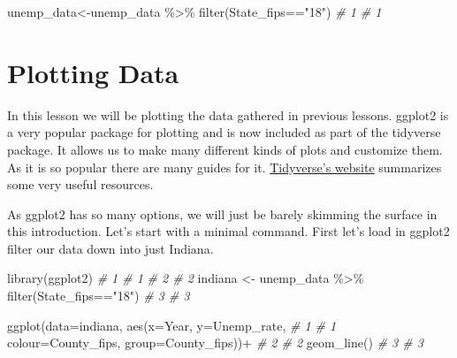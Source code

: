 \documentclass[
]{book}
\newenvironment{Shaded}{\begin{snugshade}}{\end{snugshade}}
\newcommand{\AttributeTok}[1]{\textcolor[rgb]{0.77,0.63,0.00}{#1}}
\newcommand{\CommentTok}[1]{\textcolor[rgb]{0.56,0.35,0.01}{\textit{#1}}}
\newcommand{\FunctionTok}[1]{\textcolor[rgb]{0.00,0.00,0.00}{#1}}
\newcommand{\NormalTok}[1]{#1}
\newcommand{\OtherTok}[1]{\textcolor[rgb]{0.56,0.35,0.01}{#1}}
\newcommand{\SpecialCharTok}[1]{\textcolor[rgb]{0.00,0.00,0.00}{#1}}
\newcommand{\StringTok}[1]{\textcolor[rgb]{0.31,0.60,0.02}{#1}}
\begin{document}
\begin{Shaded}
\begin{Highlighting}[]
\NormalTok{unemp\_data}\OtherTok{\textless{}{-}}\NormalTok{unemp\_data }\SpecialCharTok{\%\textgreater{}\%} \FunctionTok{filter}\NormalTok{(State\_fips}\SpecialCharTok{==}\StringTok{"18"}\NormalTok{)  }\CommentTok{\# 1  \# 1}
\end{Highlighting}
\end{Shaded}

\hypertarget{plotting-data}{%
\section{Plotting Data}\label{plotting-data}}

In this lesson we will be plotting the data gathered in previous lessons. ggplot2 is a very popular package for plotting and is now included as part of the tidyverse package. It allows us to make many different kinds of plots and customize them. As it is so popular there are many guides for it. \href{https://ggplot2.tidyverse.org/}{Tidyverse's website} summarizes some very useful resources.

As ggplot2 has so many options, we will just be barely skimming the surface in this introduction. Let's start with a minimal command. First let's load in ggplot2 filter our data down into just Indiana.

\begin{Shaded}
\begin{Highlighting}[]
\FunctionTok{library}\NormalTok{(ggplot2)                                    }\CommentTok{\# 1  \# 1}
                                                    \CommentTok{\# 2  \# 2}
\NormalTok{indiana }\OtherTok{\textless{}{-}}\NormalTok{ unemp\_data }\SpecialCharTok{\%\textgreater{}\%} \FunctionTok{filter}\NormalTok{(State\_fips}\SpecialCharTok{==}\StringTok{"18"}\NormalTok{)  }\CommentTok{\# 3  \# 3}
\end{Highlighting}
\end{Shaded}

\begin{Shaded}
\begin{Highlighting}[]
\FunctionTok{ggplot}\NormalTok{(}\AttributeTok{data=}\NormalTok{indiana, }\FunctionTok{aes}\NormalTok{(}\AttributeTok{x=}\NormalTok{Year, }\AttributeTok{y=}\NormalTok{Unemp\_rate,   }\CommentTok{\# 1  \# 1}
    \AttributeTok{colour=}\NormalTok{County\_fips, }\AttributeTok{group=}\NormalTok{County\_fips))}\SpecialCharTok{+}     \CommentTok{\# 2  \# 2}
  \FunctionTok{geom\_line}\NormalTok{()                                    }\CommentTok{\# 3  \# 3}
\end{Highlighting}
\end{Shaded}
\end{document}
